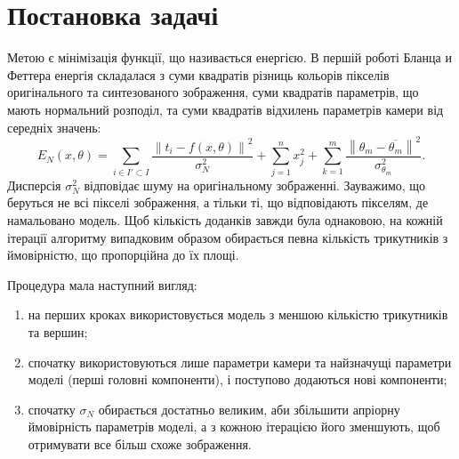 \section{Постановка задачі}

Метою є мінімізація функції, що називається енергією.
В першій роботі Бланца и Феттера \cite{blanz:romdhani:vetter}
енергія складалася з
суми квадратів різниць кольорів пікселів
оригінального та синтезованого зображення,
суми квадратів параметрів, що мають нормальний розподіл,
та суми квадратів відхилень параметрів камери від середніх значень:
\begin{equation}\label{eq:energy:blanz}
  E_N\left( x, \theta \right)
  = \sum_{i \in I' \subset I}
      \frac{\left\| t_i - f\left( x, \theta \right) \right\|^2}{\sigma^2_N}
  + \sum_{j = 1}^{n} x_j^2
  + \sum_{k = 1}^{m}
      \frac{\left\| \theta_m - \overline{\theta_m} \right\|^2}
           {\sigma^2_{\theta_m}}.
\end{equation}
Дисперсія $\sigma_N^2$ відповідає шуму на оригінальному зображенні.
Зауважимо, що беруться не всі пікселі зображення,
а тільки ті, що відповідають пікселям, де намальовано модель.
Щоб кількість доданків завжди була однаковою,
на кожній ітерації алгоритму випадковим образом
обирається певна кількість трикутників
з ймовірністю, що пропорційна до їх площі.

Процедура мала наступний вигляд:
\begin{enumerate}
  \item на перших кроках використовується модель
    з меншою кількістю трикутників та вершин;
  \item спочатку використовуються лише параметри камери
    та найзначущі параметри моделі (перші головні компоненти),
    і поступово додаються нові компоненти;
  \item спочатку $\sigma_N$ обирається достатньо великим,
    аби збільшити апріорну ймовірність параметрів моделі,
    а з кожною ітерацією його зменшують,
    щоб отримувати все більш схоже зображення.
\end{enumerate}

